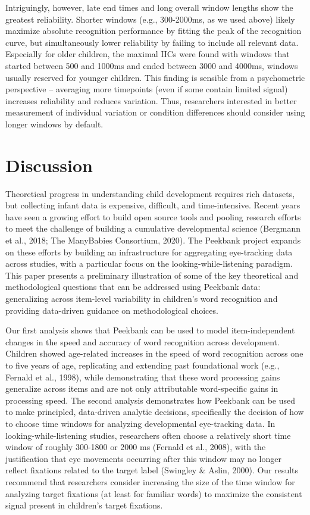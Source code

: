 \documentclass[10pt, letterpaper]{article}
\begin{document}
Intriguingly, however, late end times and long overall window lengths
show the greatest reliability. Shorter windows (e.g., 300-2000ms, as we
used above) likely maximize absolute recognition performance by fitting
the peak of the recognition curve, but simultaneously lower reliability
by failing to include all relevant data. Especially for older children,
the maximal IICs were found with windows that started between 500 and
1000ms and ended between 3000 and 4000ms, windows usually reserved for
younger children. This finding is sensible from a psychometric
perspective -- averaging more timepoints (even if some contain limited
signal) increases reliability and reduces variation. Thus, researchers
interested in better measurement of individual variation or condition
differences should consider using longer windows by default.

\hypertarget{discussion}{%
\section{Discussion}\label{discussion}}

Theoretical progress in understanding child development requires rich
datasets, but collecting infant data is expensive, difficult, and
time-intensive. Recent years have seen a growing effort to build open
source tools and pooling research efforts to meet the challenge of
building a cumulative developmental science (Bergmann et al., 2018; The
ManyBabies Consortium, 2020). The Peekbank project expands on these
efforts by building an infrastructure for aggregating eye-tracking data
across studies, with a particular focus on the looking-while-listening
paradigm. This paper presents a preliminary illustration of some of the
key theoretical and methodological questions that can be addressed using
Peekbank data: generalizing across item-level variability in children's
word recognition and providing data-driven guidance on methodological
choices.

Our first analysis shows that Peekbank can be used to model
item-independent changes in the speed and accuracy of word recognition
across development. Children showed age-related increases in the speed
of word recognition across one to five years of age, replicating and
extending past foundational work (e.g., Fernald et al., 1998), while
demonstrating that these word processing gains generalize across items
and are not only attributable word-specific gains in processing speed.
The second analysis demonstrates how Peekbank can be used to make
principled, data-driven analytic decisions, specifically the decision of
how to choose time windows for analyzing developmental eye-tracking
data. In looking-while-listening studies, researchers often choose a
relatively short time window of roughly 300-1800 or 2000 ms (Fernald et
al., 2008), with the justification that eye movements occurring after
this window may no longer reflect fixations related to the target label
(Swingley \& Aslin, 2000). Our results recommend that researchers
consider increasing the size of the time window for analyzing target
fixations (at least for familiar words) to maximize the consistent
signal present in children's target fixations.
\end{document}
